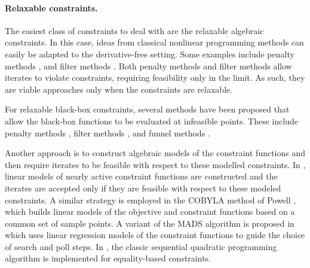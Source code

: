 \paragraph*{Relaxable constraints.}   The easiest class of constraints to deal with are the relaxable algebraic constraints.   In this case, ideas from classical nonlinear programming methods can easily be adapted to the derivative-free setting.  Some examples include 
 penalty methods \cite{lewis.torczon:globally, lewis.torczon:direct, bueno.friedlander.ea:inexact},   and filter methods \cite{brekelmans.driessen.ea:constrained, ferreira.karas.ea:global}.     
Both penalty methods and filter methods allow iterates to violate constraints, requiring feasibility only in the limit.  As such, they are viable approaches only when the constraints are relaxable.    
 
For relaxable black-box constraints,  several methods have been proposed that allow the black-box functions to be evaluated at infeasible points.  These include penalty methods
\cite{audet.dennis:progressive, liuzzi.lucidi:derivative-free, liuzzi.lucidi.ea:sequential,fasano.liuzzi.ea:linesearch,diniz-ehrhardt.martinez.ea:derivative-free,picheny2016bayesian}, filter methods \cite{audet.dennis:pattern, pourmohamad:combining,echebest.schuverdt.ea:inexact},  and funnel methods \cite{sampaio.toint:derivative-free,sampaio.toint:numerical}.

Another approach is to construct algebraic models of the constraint functions and then require iterates to be feasible with respect to these modelled constraints.
In \cite{glass.cooper:sequential},  linear models of nearly active constraint functions are constructed and the iterates are accepted only if they are feasible with respect to these modeled constraints.     A similar strategy is employed in the COBYLA method of Powell \cite{powell:direct}, which builds linear models of the objective and constraint functions based on a common set of sample points.    
A variant of the MADS algorithm is proposed in \cite{burmen.olensek.ea:mesh} which uses linear regression models of the constraint functions to guide the choice of search and poll steps.   In \cite{Troltzsch2016},  the classic sequential quadratic programming algorithm is implemented for equality-based constraints.







